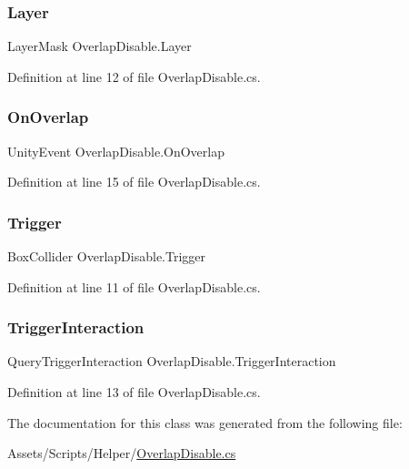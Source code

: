 \subsubsection{\texorpdfstring{Layer}{Layer}}
{\footnotesize\ttfamily Layer\+Mask Overlap\+Disable.\+Layer}



Definition at line 12 of file Overlap\+Disable.\+cs.

\mbox{\label{class_overlap_disable_a696861a2d9acb813d1229f5505707432}} 
\subsubsection{\texorpdfstring{On\+Overlap}{OnOverlap}}
{\footnotesize\ttfamily Unity\+Event Overlap\+Disable.\+On\+Overlap}



Definition at line 15 of file Overlap\+Disable.\+cs.

\mbox{\label{class_overlap_disable_a44594a05e148a89bccf72a28118c4b7b}} 
\subsubsection{\texorpdfstring{Trigger}{Trigger}}
{\footnotesize\ttfamily Box\+Collider Overlap\+Disable.\+Trigger}



Definition at line 11 of file Overlap\+Disable.\+cs.

\mbox{\label{class_overlap_disable_a892d2260d9b94ca5d7dc0c060806fda4}} 
\subsubsection{\texorpdfstring{Trigger\+Interaction}{TriggerInteraction}}
{\footnotesize\ttfamily Query\+Trigger\+Interaction Overlap\+Disable.\+Trigger\+Interaction}



Definition at line 13 of file Overlap\+Disable.\+cs.



The documentation for this class was generated from the following file\+:\begin{DoxyCompactItemize}
\item 
Assets/\+Scripts/\+Helper/\mbox{\hyperlink{_overlap_disable_8cs}{Overlap\+Disable.\+cs}}\end{DoxyCompactItemize}
